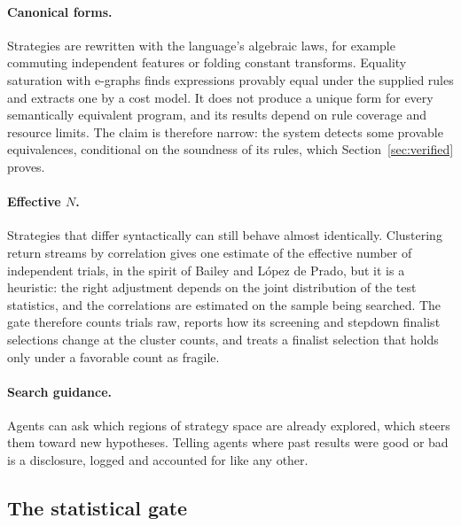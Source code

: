 \documentclass[11pt]{article}
\begin{document}
\paragraph{Canonical forms.} Strategies are rewritten with the language's algebraic laws, for example commuting independent features or folding constant transforms. Equality saturation with e-graphs \cite{willsey2021} finds expressions provably equal under the supplied rules and extracts one by a cost model. It does not produce a unique form for every semantically equivalent program, and its results depend on rule coverage and resource limits. The claim is therefore narrow: the system detects some provable equivalences, conditional on the soundness of its rules, which Section~\ref{sec:verified} proves.

\paragraph{Effective $N$.} Strategies that differ syntactically can still behave almost identically. Clustering return streams by correlation gives one estimate of the effective number of independent trials, in the spirit of Bailey and L\'opez de Prado, but it is a heuristic: the right adjustment depends on the joint distribution of the test statistics, and the correlations are estimated on the sample being searched. The gate therefore counts trials raw, reports how its screening and stepdown finalist selections change at the cluster counts, and treats a finalist selection that holds only under a favorable count as fragile.

\paragraph{Search guidance.} Agents can ask which regions of strategy space are already explored, which steers them toward new hypotheses. Telling agents where past results were good or bad is a disclosure, logged and accounted for like any other.

\subsection{The statistical gate}\label{sec:gate}
\end{document}
